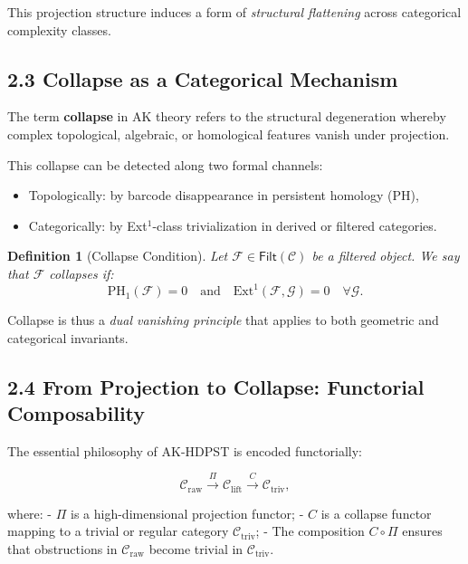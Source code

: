 \documentclass[11pt]{article}
\newtheorem{definition}[theorem]{Definition}
\begin{document}
This projection structure induces a form of \emph{structural flattening} across categorical complexity classes.

\subsection*{2.3 Collapse as a Categorical Mechanism}

The term \textbf{collapse} in AK theory refers to the structural degeneration whereby complex topological,  
algebraic, or homological features vanish under projection.

This collapse can be detected along two formal channels:

\begin{itemize}
  \item Topologically: by barcode disappearance in persistent homology (PH),
  \item Categorically: by Ext$^1$-class trivialization in derived or filtered categories.
\end{itemize}

\begin{definition}[Collapse Condition]
Let \( \mathcal{F} \in \mathsf{Filt}(\mathcal{C}) \) be a filtered object.  
We say that \( \mathcal{F} \) \emph{collapses} if:
\[
\mathrm{PH}_1(\mathcal{F}) = 0 \quad \text{and} \quad \mathrm{Ext}^1(\mathcal{F}, \mathcal{G}) = 0 \quad \forall \mathcal{G}.
\]
\end{definition}

Collapse is thus a \emph{dual vanishing principle} that applies to both geometric and categorical invariants.

\subsection*{2.4 From Projection to Collapse: Functorial Composability}

The essential philosophy of AK-HDPST is encoded functorially:

\[
\mathcal{C}_{\text{raw}} 
\overset{\Pi}{\longrightarrow} 
\mathcal{C}_{\text{lift}} 
\overset{C}{\longrightarrow} 
\mathcal{C}_{\text{triv}},
\]

where:
- \( \Pi \) is a high-dimensional projection functor;
- \( C \) is a collapse functor mapping to a trivial or regular category \( \mathcal{C}_{\text{triv}} \);
- The composition \( C \circ \Pi \) ensures that obstructions in \( \mathcal{C}_{\text{raw}} \) become trivial in \( \mathcal{C}_{\text{triv}} \).
\end{document}
